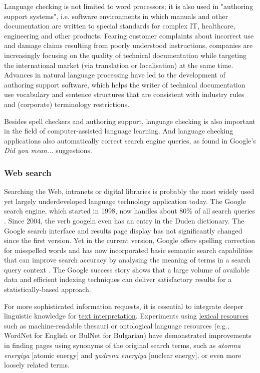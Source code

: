 \begin{multicols}{2}
Language checking is not limited to word processors; it is also used in "authoring support systems", i.e. software environments in which manuals and other documentation are written to special standards for complex IT, healthcare, engineering and other products. Fearing customer complaints about incorrect use and damage claims resulting from poorly understood instructions, companies are increasingly focusing on the quality of technical documentation while targeting the international market (via translation or localisation) at the same time. Advances in natural language processing have led to the development of authoring support software, which helps the writer of technical documentation use vocabulary and sentence structures that are consistent with industry rules and (corporate) terminology restrictions.

Besides spell checkers and authoring support, language checking is also important in the field of computer-assisted language learning. And language checking applications also automatically correct search engine queries, as found in Google's \textit{Did you mean...} suggestions. 


\subsubsection{Web search}


Searching the Web, intranets or digital libraries is probably the most widely used yet largely underdeveloped language technology application today. The Google search engine, which started in 1998, now handles about 80\% of all search queries \cite{spi1}. Since 2004, the verb googeln even has an entry in the Duden dictionary. The Google search interface and results page display has not significantly changed since the first version. Yet in the current version, Google offers spelling correction for misspelled words and  has now incorporated basic semantic search capabilities that can improve search accuracy by analysing the meaning of terms in a search query context  \cite{pc1}. The Google success story shows that a large volume of available data and efficient indexing techniques can deliver satisfactory results for a statistically-based approach.  

For more sophisticated information requests, it is essential to integrate deeper linguistic knowledge for \uline{text interpretation}. Experiments using \uline{lexical resources} such as machine-readable thesauri or ontological language resources (e.g., WordNet for English or BulNet for Bulgarian) have demonstrated improvements in finding pages using synonyms of the original search terms, such as {\it atomna energiya} [atomic energy] and {\it yadrena energiya} [nuclear energy], or even more loosely related terms. 


\end{multicols}
